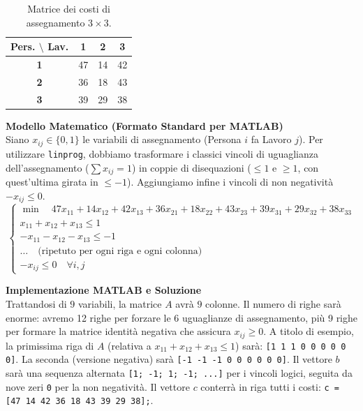 \documentclass[12pt, a4paper]{article}
\renewcommand{\arraystretch}{1.25}
\begin{document}
	\begin{table}[H]
		\centering
		\renewcommand{\arraystretch}{1.3}
		\begin{tabular}{|c|c|c|c|}
			\hline
			\textbf{Pers. $\setminus$ Lav.} & \textbf{1} & \textbf{2} & \textbf{3} \\ \hline
			\textbf{1} & 47 & 14 & 42 \\ \hline
			\textbf{2} & 36 & 18 & 43 \\ \hline
			\textbf{3} & 39 & 29 & 38 \\ \hline
		\end{tabular}
		\caption{Matrice dei costi di assegnamento $3 \times 3$.}
	\end{table}
	
	\textbf{Modello Matematico (Formato Standard per MATLAB)}\\
	Siano $x_{ij} \in \{0,1\}$ le variabili di assegnamento (Persona $i$ fa Lavoro $j$).
	Per utilizzare \texttt{linprog}, dobbiamo trasformare i classici vincoli di uguaglianza dell'assegnamento ($\sum x_{ij} = 1$) in coppie di disequazioni ($\leq 1$ e $\geq 1$, con quest'ultima girata in $\leq -1$). Aggiungiamo infine i vincoli di non negatività $-x_{ij} \leq 0$.
	\[
	\begin{cases}
		\min \quad 47x_{11} + 14x_{12} + 42x_{13} + 36x_{21} + 18x_{22} + 43x_{23} + 39x_{31} + 29x_{32} + 38x_{33} \\[6pt]
		x_{11} + x_{12} + x_{13} \leq 1 \\
		-x_{11} - x_{12} - x_{13} \leq -1 \\
		\dots \quad \text{(ripetuto per ogni riga e ogni colonna)} \\[6pt]
		-x_{ij} \leq 0 \quad \forall i,j
	\end{cases}
	\]
	
	\textbf{Implementazione MATLAB e Soluzione}\\
	Trattandosi di $9$ variabili, la matrice $A$ avrà $9$ colonne. Il numero di righe sarà enorme: avremo 12 righe per forzare le 6 uguaglianze di assegnamento, più 9 righe per formare la matrice identità negativa che assicura $x_{ij} \geq 0$.
	A titolo di esempio, la primissima riga di $A$ (relativa a $x_{11}+x_{12}+x_{13} \leq 1$) sarà:
	\texttt{[1 1 1 0 0 0 0 0 0]}. La seconda (versione negativa) sarà \texttt{[-1 -1 -1 0 0 0 0 0 0]}.
	Il vettore $b$ sarà una sequenza alternata \texttt{[1; -1; 1; -1; ...]} per i vincoli logici, seguita da nove zeri \texttt{0} per la non negatività.
	Il vettore $c$ conterrà in riga tutti i costi: \texttt{c = [47 14 42 36 18 43 39 29 38];}.
	
\end{document}

